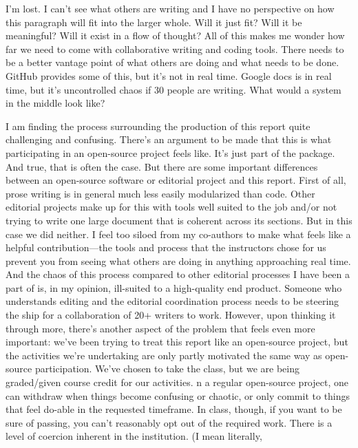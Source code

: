 I'm lost. I can't see what others are writing and I have no perspective on how this paragraph will fit into the larger whole. Will it just fit? Will it be meaningful? Will it exist in a flow of thought? All of this makes me wonder how far we need to come with collaborative writing and coding tools. There needs to be a better vantage point of what others are doing and what needs to be done. GitHub provides some of this, but it's not in real time. Google docs is in real time, but it's uncontrolled chaos if 30 people are writing. What would a system in the middle look like?

I am finding the process surrounding the production of this report quite challenging and confusing. 
There's an argument to be made that this is what participating in an open-source project feels like. 
It's just part of the package. And true, that is often the case. But there are some important
differences between an open-source software or editorial project and this report.
First of all, prose writing is in general much less easily modularized than code. 
Other editorial projects make up for this with tools well suited to the job and/or
not trying to write one large document that is coherent across its sections. But in this 
case we did neither. I feel too siloed from my co-authors to make what feels like a helpful 
contribution---the tools and process that the instructors chose for us prevent you from seeing what others 
are doing in anything approaching real time. And the chaos of this process compared to other editorial processes I have 
been a part of is, in my opinion, ill-suited to a high-quality end product. Someone who 
understands editing and the editorial coordination process needs to be steering the ship for 
a collaboration of 20+ writers to work. However, upon thinking it through more, there's another aspect of the problem that 
feels even more important: we've been trying to treat this report like an open-source project, 
but the activities we're undertaking are only partly motivated the same way as open-source 
participation. We've chosen to take the class, but we are being graded/given course credit 
for our activities. n a regular open-source project, one can withdraw when things become 
confusing or chaotic, or only commit to things that feel do-able in the requested timeframe. 
In class, though, if you want to be sure of passing, you can't reasonably opt out of the 
required work. There is a level of coercion inherent in the institution. (I mean literally, 
